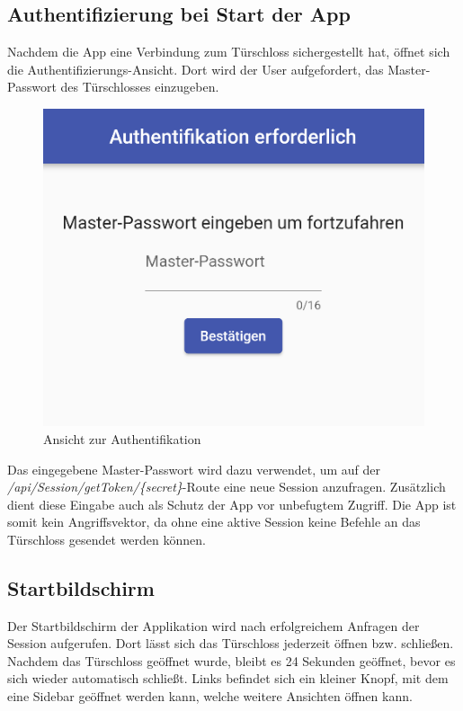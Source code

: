 \subsection{Authentifizierung bei Start der App}
Nachdem die App eine Verbindung zum Türschloss sichergestellt hat, öffnet sich die Authentifizierungs-Ansicht.
Dort wird der User aufgefordert, das Master-Passwort des Türschlosses einzugeben.

\begin{figure}[H]
    \begin{center}
        \includegraphics[width=.5\textwidth]{images/mobile/AuthScreen.png}
        \caption{Ansicht zur Authentifikation}
    \end{center}
\end{figure}

Das eingegebene Master-Passwort wird dazu verwendet, um auf der \textit{/api/Session/getToken/\{secret\}}-Route
eine neue Session anzufragen. Zusätzlich dient diese Eingabe auch als Schutz der App vor unbefugtem Zugriff.
Die App ist somit kein Angriffsvektor, da ohne eine aktive Session keine Befehle an das Türschloss gesendet werden können.
\pagebreak
\subsection{Startbildschirm}
Der Startbildschirm der Applikation wird nach erfolgreichem Anfragen der Session aufgerufen.
Dort lässt sich das Türschloss jederzeit öffnen bzw. schließen.
Nachdem das Türschloss geöffnet wurde, bleibt es 24 Sekunden geöffnet, bevor es sich wieder automatisch schließt.
Links befindet sich ein kleiner Knopf, mit dem eine Sidebar geöffnet werden kann, welche weitere Ansichten öffnen kann.

